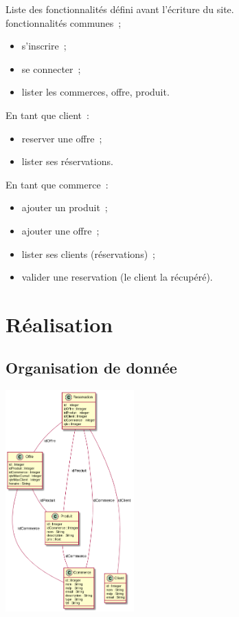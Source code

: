 \documentclass{beamer}
\begin{document}
\begin{frame}
	Liste des fonctionnalités défini avant l'écriture du site. \\
	fonctionnalités communes~;
	\begin{itemize}
		\item s'inscrire~;
		\item se connecter~;
		\item lister les commerces, offre, produit.
	\end{itemize}

	En tant que client~:
	\begin{itemize}
		\item reserver une offre~;
		\item lister ses réservations.
	\end{itemize}
	
	En tant que commerce~:
	\begin{itemize}
		\item ajouter un produit~;
		\item ajouter une offre~;
		\item lister ses clients (réservations)~;
		\item valider une reservation (le client la récupéré).
	\end{itemize}


\end{frame}


\section{Réalisation}

\subsection{Organisation de donnée}

\begin{frame}
	\begin{center}
		\includegraphics[height=8.5cm]{uml.png}
	\end{center}
\end{frame}
\end{document}
